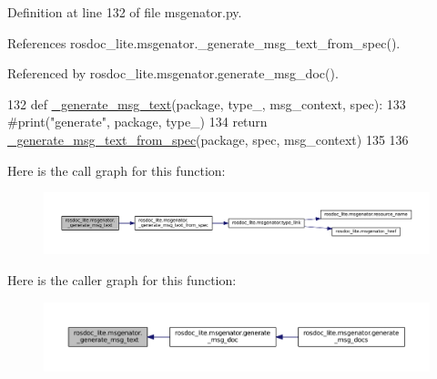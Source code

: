 Definition at line 132 of file msgenator.\+py.



References rosdoc\+\_\+lite.\+msgenator.\+\_\+generate\+\_\+msg\+\_\+text\+\_\+from\+\_\+spec().



Referenced by rosdoc\+\_\+lite.\+msgenator.\+generate\+\_\+msg\+\_\+doc().


\begin{DoxyCode}
132 \textcolor{keyword}{def }\hyperlink{namespacerosdoc__lite_1_1msgenator_a2dffbb93d16e371623e82b6ce7f46250}{\_generate\_msg\_text}(package, type\_, msg\_context, spec):
133     \textcolor{comment}{#print("generate", package, type\_)}
134     \textcolor{keywordflow}{return} \hyperlink{namespacerosdoc__lite_1_1msgenator_ae10b8c65520e15517f506220db1d916e}{\_generate\_msg\_text\_from\_spec}(package, spec, msg\_context)
135 
136 
\end{DoxyCode}


Here is the call graph for this function\+:
\nopagebreak
\begin{figure}[H]
\begin{center}
\leavevmode
\includegraphics[width=350pt]{namespacerosdoc__lite_1_1msgenator_a2dffbb93d16e371623e82b6ce7f46250_cgraph}
\end{center}
\end{figure}




Here is the caller graph for this function\+:
\nopagebreak
\begin{figure}[H]
\begin{center}
\leavevmode
\includegraphics[width=350pt]{namespacerosdoc__lite_1_1msgenator_a2dffbb93d16e371623e82b6ce7f46250_icgraph}
\end{center}
\end{figure}


